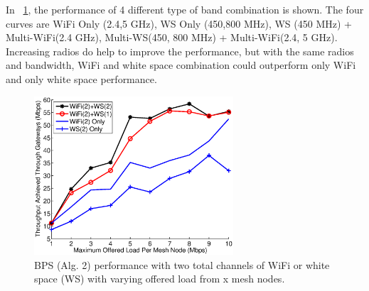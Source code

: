 In ~\ref{fig:wifiws}, the performance of 4 different type of band combination is shown. 
The four curves are WiFi Only (2.4,5 GHz), WS Only (450,800 MHz), WS (450 MHz) + Multi-WiFi(2.4 GHz), Multi-WS(450, 800 MHz) + Multi-WiFi(2.4, 5 GHz). 
Increasing radios do help to improve the performance, but with the same radios and bandwidth, WiFi and white space combination could outperform only WiFi and only white space performance.

\begin{figure}
\centering
\includegraphics[width=74mm]{figures/wifiws}
\vspace{-0.1in}
\caption{BPS (Alg. 2) performance with two total channels of WiFi or white space (WS) with varying offered load from x mesh nodes.}
\label{fig:wifiws}
\end{figure}
